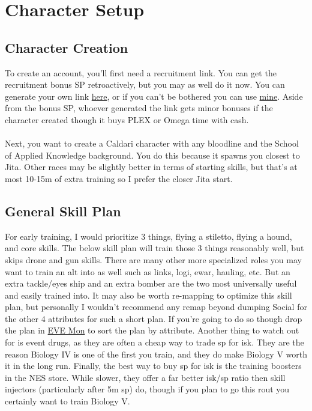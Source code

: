 \documentclass{article}
\begin{document}
\clearpage
\section{Character Setup}
\subsection{Character Creation}
To create an account, you'll first need a recruitment link. You can get the recruitment bonus SP retroactively, but you may as well do it now. 
You can generate your own link \href{https://www.eveonline.com/recruit}{here}, or if you can't be bothered you can use \href{https://www.eveonline.com/signup?invc=79ffb3de-ef43-400b-a568-e45ac72c6715}{mine}.
Aside from the bonus SP, whoever generated the link gets minor bonuses if the character created though it buys PLEX or Omega time with cash.
\\
\\
Next, you want to create a Caldari character with any bloodline and the School of Applied Knowledge background. You do this because it spawns
you closest to Jita. Other races may be slightly better in terms of starting skills, but that's at most 10-15m of extra training so I prefer the
closer Jita start.

\clearpage
\subsection{General Skill Plan} 
For early training, I would prioritize 3 things, flying a stiletto, flying a hound, and core skills. The below skill plan will train those 3 things
reasonably well, but skips drone and gun skills. There are many other more specialized roles you may want to train an alt into as well such as links,
logi, ewar, hauling, etc. But an extra tackle/eyes ship and an extra bomber are the two most universally useful and easily trained into. It may also be 
worth re-mapping to optimize this skill plan, but personally I wouldn't recommend any remap beyond dumping Social for the other 4 attributes for such a 
short plan. If you're going to do so though drop the plan in \href{https://evemondevteam.github.io/evemon/}{EVE Mon} to sort the plan by attribute.
Another thing to watch out for is event drugs, as they are often a cheap way to trade sp for isk. They are the reason Biology IV is one of the first 
you train, and they do make Biology V worth it in the long run. Finally, the best way to buy sp for isk is the training boosters in the NES store. While 
slower, they offer a far better isk/sp ratio then skill injectors (particularly after 5m sp) do, though if you plan to go this rout you certainly want to train Biology V.
\end{document}
